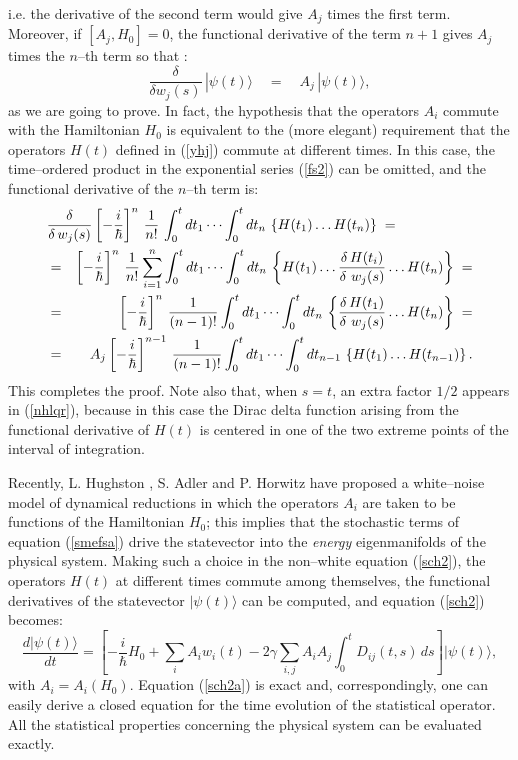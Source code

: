 \documentclass[12pt]{article}
\begin{document}
i.e. the derivative of the second term would give $A_{j}$ times
the first term. Moreover, if $[A_{j}, H_{0}] = 0$, the functional
derivative of the term $n+1$ gives $A_{j}$ times the $n$--th term
so that :
\begin{equation} \label{nhlqr}
\frac{\delta}{\delta w_{j}(s)}\, |\psi(t)\rangle \quad = \quad
A_{j}\, |\psi(t)\rangle,
\end{equation}
as we are going to prove. In fact, the hypothesis that the
operators $A_{i}$ commute with the Hamiltonian $H_{0}$ is
equivalent to the (more elegant) requirement that the operators
$H(t)$ defined in (\ref{yhj}) commute at different times. In this
case, the time--ordered product in the exponential series
(\ref{fs2}) can be omitted, and the functional derivative of the
$n$--th term is:
\begin{eqnarray}
\lefteqn{\frac{\delta}{\delta\, w_{j}(s)} \left[-\frac{i}{\hbar}
\right]^{n}\, \frac{1}{n!} \, \int_{0}^{t} dt_{1} \cdots
\int_{0}^{t} dt_{n}\, \left\{H(t_{1}) \ldots H(t_{n}) \right\} \;
=}
\nonumber \\
& = & \left[-\frac{i}{\hbar}\right]^{n}\, \frac{1}{n!}
\sum_{i=1}^{n} \int_{0}^{t} dt_{1} \cdots  \int_{0}^{t} dt_{n}\,
\left\{H(t_{1}) \ldots \frac{\delta\, H(t_{i})}{\delta\ w_{j}(s)}
\ldots H(t_{n})
\right\}\; = \nonumber \\
& = & \left[-\frac{i}{\hbar}\right]^{n}\, \frac{1}{(n-1)!}
\int_{0}^{t} dt_{1} \cdots  \int_{0}^{t} dt_{n}\, \left\{
\frac{\delta\, H(t_{1})}{\delta\ w_{j}(s)} \ldots H(t_{n})
\right\}\; = \nonumber \\
& = & A_{j} \left[-\frac{i}{\hbar}\right]^{n-1}\, \frac{1}{(n-1)!}
\int_{0}^{t} dt_{1} \cdots  \int_{0}^{t} dt_{n-1}\, \left\{
H(t_{1}) \ldots H(t_{n-1}) \right\}.
\end{eqnarray}
This completes the proof. Note also that, when $s=t$, an extra
factor $1/2$ appears in (\ref{nhlqr}), because in this case the
Dirac delta function arising from the functional derivative of
$H(t)$ is centered in one of the two extreme points of the
interval of integration.

Recently, L. Hughston \cite{hugh}, S. Adler and P. Horwitz
\cite{ad1, ad2} have proposed a white--noise model of dynamical
reductions in which the operators $A_{i}$ are taken to be
functions of the Hamiltonian $H_{0}$; this implies that the
stochastic terms of equation (\ref{smefsa}) drive the statevector
into the {\it energy} eigenmanifolds of the physical system.
Making such a choice in the non--white equation (\ref {sch2}), the
operators $H(t)$ at different times commute among themselves, the
functional derivatives of the statevector $|\psi(t)\rangle$ can be
computed, and equation (\ref{sch2}) becomes:
\begin{equation}\label{sch2a}
\frac{d|\psi(t)\rangle}{dt} =  \left[ -\frac{i}{\hbar} H_{0} +
\sum_{i} A_{i} w_{i}(t) - 2\gamma \sum_{i,j}A_{i} A_{j}
\int_{0}^{t} D_{ij}(t,s)\,ds \right] |\psi(t)\rangle,
\end{equation}
with $A_{i} = A_{i}(H_{0})$. Equation (\ref{sch2a}) is exact and,
correspondingly, one can easily derive a closed equation for the
time evolution of the statistical operator. All the statistical
properties concerning the physical system can be evaluated
exactly.
\end{document}
